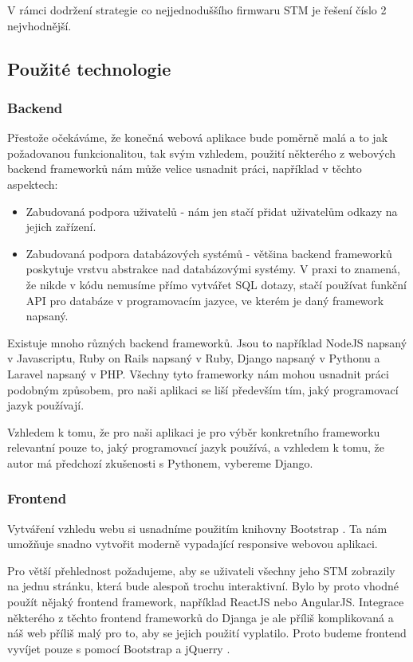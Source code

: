 V rámci dodržení strategie co nejjednoduššího firmwaru STM je řešení číslo 2 nejvhodnější.

\subsection{Použité technologie}

\subsubsection{Backend}
Přestože očekáváme, že konečná webová aplikace bude poměrně malá a to jak požadovanou funkcionalitou, tak svým
vzhledem, použití některého z webových backend frameworků nám může velice usnadnit práci, například v těchto
aspektech:
\begin{itemize}
    \item Zabudovaná podpora uživatelů - nám jen stačí přidat uživatelům odkazy na jejich
        zařízení.
    \item Zabudovaná podpora databázových systémů - většina backend frameworků poskytuje vrstvu abstrakce nad
        databázovými systémy. V praxi to znamená, že nikde v kódu nemusíme přímo vytvářet SQL dotazy,
        stačí používat funkční API pro databáze v programovacím jazyce, ve kterém je daný framework napsaný.
\end{itemize}

Existuje mnoho různých backend frameworků.
Jsou to například NodeJS napsaný v Javascriptu, Ruby on Rails napsaný v Ruby, Django \cite{Django} napsaný v Pythonu a
Laravel napsaný v PHP.
Všechny tyto frameworky nám mohou usnadnit práci podobným způsobem, pro naši aplikaci se liší především
tím, jaký programovací jazyk používají.

Vzhledem k tomu, že pro naši aplikaci je pro výběr konkretního frameworku relevantní pouze to, jaký programovací
jazyk používá, a vzhledem k tomu, že autor má předchozí zkušenosti s Pythonem, vybereme Django.

\subsubsection{Frontend}
Vytváření vzhledu webu si usnadníme použitím knihovny Bootstrap \cite{Bootstrap}.
Ta nám umožňuje snadno vytvořit moderně vypadající responsive webovou aplikaci. 

Pro větší přehlednost požadujeme, aby se uživateli všechny jeho STM zobrazily na jednu stránku,
která bude alespoň trochu interaktivní.
Bylo by proto vhodné použít nějaký frontend framework, například ReactJS nebo AngularJS.
Integrace některého z těchto frontend frameworků do Djanga je ale příliš komplikovaná a náš web
příliš malý pro to, aby se jejich použití vyplatilo.
Proto budeme frontend vyvíjet pouze s pomocí Bootstrap a jQuerry \cite{jQuery}.
